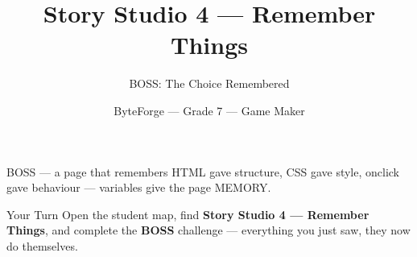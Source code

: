 \documentclass[aspectratio=169]{beamer}
\title{Story Studio 4 — Remember Things}
\subtitle{BOSS: The Choice Remembered}
\author{ByteForge --- Grade 7 --- Game Maker}
\date{}
\begin{document}
\begin{frame}
    \titlepage
\end{frame}

\begin{frame}{BOSS — a page that remembers}
    \Large
    HTML gave structure, CSS gave style, onclick gave behaviour — variables give the page MEMORY.
\end{frame}

\begin{frame}{Your Turn}
    \Large
    Open the student map, find \textbf{Story Studio 4 — Remember Things}, and complete
    the \textbf{BOSS} challenge --- everything you just saw, they now do themselves.
\end{frame}
\end{document}
